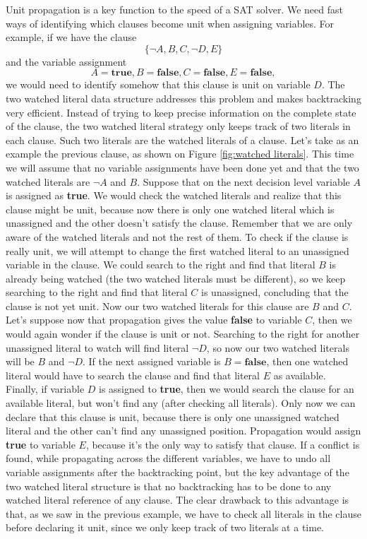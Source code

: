 \documentclass[12pt]{diicc}
\begin{document}
Unit propagation is a key function to the speed of a SAT solver. We need fast ways of identifying which clauses become unit when assigning variables. For example, if we have the clause
\[\{\neg A,B,C,\neg D,E\}\]
and the variable assignment
\[A=\textbf{true}, B=\textbf{false}, C=\textbf{false}, E=\textbf{false},\]
we would need to identify somehow that this clause is unit on variable $D$. The two watched literal data structure addresses this problem and makes backtracking very efficient. Instead of trying to keep precise information on the complete state of the clause, the two watched literal strategy only keeps track of two literals in each clause. Such two literals are the watched literals of a clause. Let's take as an example the previous clause, as shown on Figure \ref{fig:watched literals}. This time we will assume that no variable assignments have been done yet and that the two watched literals are $\neg A$ and $B$. Suppose that on the next decision level variable $A$ is assigned as \textbf{true}. We would check the watched literals and realize that this clause might be unit, because now there is only one watched literal which is unassigned and the other doesn't satisfy the clause. Remember that we are only aware of the watched literals and not the rest of them. To check if the clause is really unit, we will attempt to change the first watched literal to an unassigned variable in the clause. We could search to the right and find that literal $B$ is already being watched (the two watched literals must be different), so we keep searching to the right and find that literal $C$ is unassigned, concluding that the clause is not yet unit. Now our two watched literals for this clause are $B$ and $C$. Let's suppose now that propagation gives the value \textbf{false} to variable $C$, then we would again wonder if the clause is unit or not. Searching to the right for another unassigned literal to watch will find literal $\neg D$, so now our two watched literals will be $B$ and $\neg D$. If the next assigned variable is $B=\textbf{false}$, then one watched literal would have to search the clause and find that literal $E$ as available. Finally, if variable $D$ is assigned to \textbf{true}, then we would search the clause for an available literal, but won't find any (after checking all literals). Only now we can declare that this clause is unit, because there is only one unassigned watched literal and the other can't find any unassigned position. Propagation would assign \textbf{true} to variable $E$, because it's the only way to satisfy that clause. If a conflict is found, while propagating across the different variables, we have to undo all variable assignments after the backtracking point, but the key advantage of the two watched literal structure is that no backtracking has to be done to any watched literal reference of any clause. The clear drawback to this advantage is that, as we saw in the previous example, we have to check all literals in the clause before declaring it unit, since we only keep track of two literals at a time.  
\end{document}
